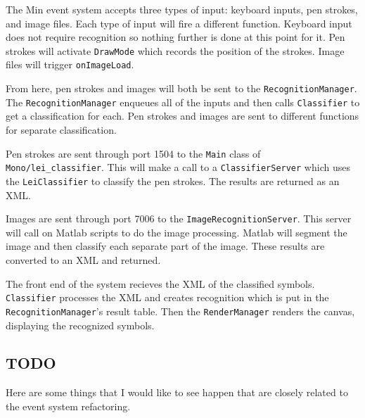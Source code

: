 \documentclass[letterpaper]{article}
\begin{document}
The Min event system accepts three types of input: keyboard inputs, pen strokes, and
image files. Each type of input will fire a different function. Keyboard input does
not require recognition so nothing further is done at this point for it. Pen strokes
will activate \verb+DrawMode+ which records the position of the strokes. Image files
will trigger \verb+onImageLoad+.

From here, pen strokes and images will both be sent to the \verb+RecognitionManager+.
The \verb+RecognitionManager+ enqueues all of the inputs and then calls \verb+Classifier+
to get a classification for each. Pen strokes and images are sent to different functions
for separate classification.

Pen strokes are sent through port 1504 to the \verb+Main+ class of \verb+Mono/lei_classifier+.
This will make a call to a \verb+ClassifierServer+ which uses the \verb+LeiClassifier+ to
classify the pen strokes. The results are returned as an XML.

Images are sent through port 7006 to the \verb+ImageRecognitionServer+. This server will
call on Matlab scripts to do the image processing. Matlab will segment the image and then
classify each separate part of the image. These results are converted to an XML and returned.

The front end of the system recieves the XML of the classified symbols. \verb+Classifier+
processes the XML and creates recognition which is put in the \verb+RecognitionManager+'s
result table. Then the \verb+RenderManager+ renders the canvas, displaying the recognized
symbols.


\subsection*{TODO}
Here are some things that I would like to see happen that are closely related to
the event system refactoring.
\end{document}
